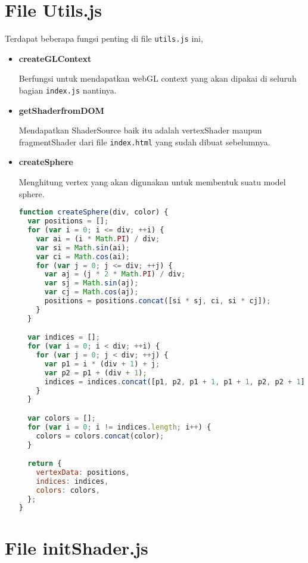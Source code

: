 \section{File Utils.js}

Terdapat beberapa fungsi penting di file \texttt{utils.js} ini,

\begin{itemize}
  \item \textbf{createGLContext}

        Berfungsi untuk mendapatkan webGL context yang akan dipakai di seluruh bagian \texttt{index.js} nantinya.

  \item \textbf{getShaderfromDOM}

        Mendapatkan ShaderSource baik itu adalah vertexShader maupun fragmentShader dari file \texttt{index.html} yang sudah dibuat sebelumnya.

  \item \textbf{createSphere}

        Menghitung vertex yang akan digunakan untuk membentuk suatu model sphere.


        \begin{lstlisting}[language=javascript, label={lst: createSphere}, caption={fungsi createSphere}]
function createSphere(div, color) {
  var positions = [];
  for (var i = 0; i <= div; ++i) {
    var ai = (i * Math.PI) / div;
    var si = Math.sin(ai);
    var ci = Math.cos(ai);
    for (var j = 0; j <= div; ++j) {
      var aj = (j * 2 * Math.PI) / div;
      var sj = Math.sin(aj);
      var cj = Math.cos(aj);
      positions = positions.concat([si * sj, ci, si * cj]);
    }
  }

  var indices = [];
  for (var i = 0; i < div; ++i) {
    for (var j = 0; j < div; ++j) {
      var p1 = i * (div + 1) + j;
      var p2 = p1 + (div + 1);
      indices = indices.concat([p1, p2, p1 + 1, p1 + 1, p2, p2 + 1]);
    }
  }

  var colors = [];
  for (var i = 0; i != indices.length; i++) {
    colors = colors.concat(color);
  }

  return {
    vertexData: positions,
    indices: indices,
    colors: colors,
  };
}

\end{lstlisting}

\end{itemize}

\section{File initShader.js}

